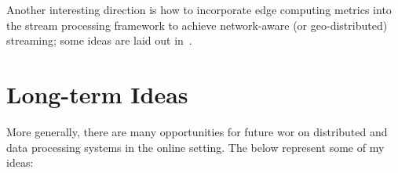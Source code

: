 

Another interesting direction is how to incorporate edge computing metrics into the stream processing framework to achieve network-aware (or geo-distributed) streaming; some ideas are laid out in~.

\section{Long-term Ideas}

More generally, there are many opportunities for future wor on distributed and data processing systems in the online setting.
The below represent some of my ideas:

